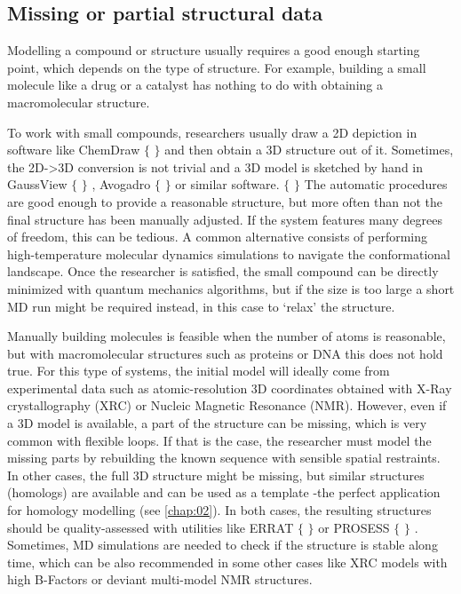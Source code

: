 \subsection{Missing or partial structural data}
Modelling a compound or structure usually requires a good enough starting point, which depends on the type of structure. For example, building a small molecule like a drug or a catalyst has nothing to do with obtaining a macromolecular structure.

To work with small compounds, researchers usually draw a 2D depiction in software like ChemDraw $ \{ $ $ \} $  and then obtain a 3D structure out of it. Sometimes, the 2D->3D conversion is not trivial and a 3D model is sketched by hand in GaussView $ \{ $ $ \} $ , Avogadro $ \{ $ $ \} $  or similar software. $ \{ $ $ \} $  The automatic procedures are good enough to provide a reasonable structure, but more often than not the final structure has been manually adjusted. If the system features many degrees of freedom, this can be tedious. A common alternative consists of performing high-temperature molecular dynamics simulations to navigate the conformational landscape. Once the researcher is satisfied, the small compound can be directly minimized with quantum mechanics algorithms, but if the size is too large a short MD run might be required instead, in this case to ‘relax’ the structure.

Manually building molecules is feasible when the number of atoms is reasonable, but with macromolecular structures such as proteins or DNA this does not hold true. For this type of systems, the initial model will ideally come from experimental data such as atomic-resolution 3D coordinates obtained with X-Ray crystallography (XRC) or Nucleic Magnetic Resonance (NMR). However, even if a 3D model is available, a part of the structure can be missing, which is very common with flexible loops. If that is the case, the researcher must model the missing parts by rebuilding the known sequence with sensible spatial restraints. In other cases, the full 3D structure might be missing, but similar structures (homologs) are available and can be used as a template -the perfect application for homology modelling (see \autoref{chap:02}). In both cases, the resulting structures should be quality-assessed with utilities like ERRAT $ \{ $ $ \} $  or PROSESS $ \{ $ $ \} $ . Sometimes, MD simulations are needed to check if the structure is stable along time, which can be also recommended in some other cases like XRC models with high B-Factors or deviant multi-model NMR structures.

